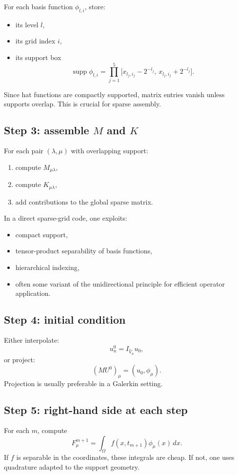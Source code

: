 \documentclass[11pt,a4paper]{report}
\begin{document}
For each basis function $\phi_{l,i}$, store:
\begin{itemize}
\item its level $l$,
\item its grid index $i$,
\item its support box
$$
\operatorname{supp}\phi_{l,i}
=
\prod_{j=1}^5
\bigl[x_{l_j,i_j}-2^{-l_j},\,x_{l_j,i_j}+2^{-l_j}\bigr].
$$
\end{itemize}
Since hat functions are compactly supported, matrix entries vanish unless supports overlap. This is crucial for sparse assembly.

\subsection{Step 3: assemble $M$ and $K$}

For each pair $(\lambda,\mu)$ with overlapping support:
\begin{enumerate}
\item compute $M_{\mu\lambda}$,
\item compute $K_{\mu\lambda}$,
\item add contributions to the global sparse matrix.
\end{enumerate}
In a direct sparse-grid code, one exploits:
\begin{itemize}
\item compact support,
\item tensor-product separability of basis functions,
\item hierarchical indexing,
\item often some variant of the unidirectional principle for efficient operator application.
\end{itemize}

\subsection{Step 4: initial condition}

Either interpolate:
$$
u_n^0 = I_{\widehat V_n}u_0,
$$
or project:
$$
(MU^0)_\mu = (u_0,\phi_\mu).
$$
Projection is usually preferable in a Galerkin setting.

\subsection{Step 5: right-hand side at each step}

For each $m$, compute
$$
F_\mu^{m+1} = \int_\Omega f(x,t_{m+1})\phi_\mu(x)\,dx.
$$
If $f$ is separable in the coordinates, these integrals are cheap. If not, one uses quadrature adapted to the support geometry.
\end{document}
